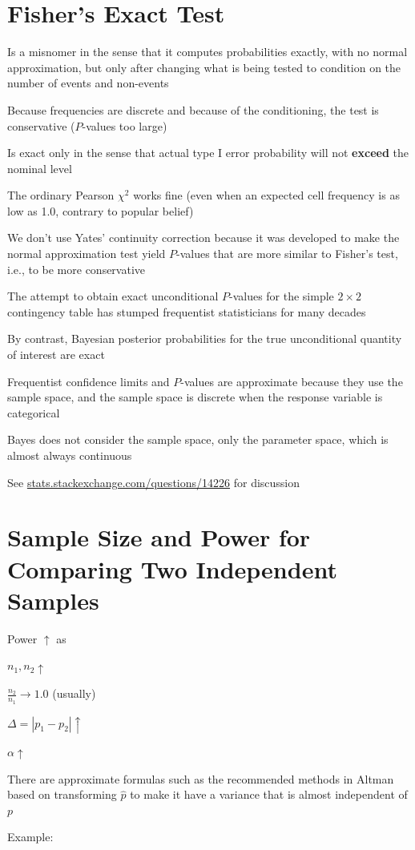 \section{Fisher's Exact Test}
\bi
\item Is a misnomer in the sense that it computes probabilities
  exactly, with no normal approximation, but only after changing what
  is being tested to condition on the number of events and non-events
\item Because frequencies are discrete and because of the
  conditioning, the test is conservative ($P$-values too large)
\item Is exact only in the sense that actual type I error probability will not \textbf{exceed} the nominal level
\item The ordinary Pearson $\chi^2$ works fine (even when
  an expected cell frequency is as low as 1.0, contrary to popular belief)
\item We don't use Yates' continuity correction because it was
  developed to make the normal approximation test yield $P$-values
  that are more similar to Fisher's test, i.e., to be more
  conservative
\item The attempt to obtain exact unconditional $P$-values for the simple $2\times 2$ contingency table has stumped frequentist statisticians for many decades~\cite{cho15elu}
\item By contrast, Bayesian posterior probabilities for the true unconditional quantity of interest are exact
 \bi
 \item Frequentist confidence limits and $P$-values are approximate because they use the sample space, and the sample space is discrete when the response variable is categorical
 \item Bayes does not consider the sample space, only the parameter space, which is almost always continuous
 \ei
\item See \href{https://stats.stackexchange.com/questions/14226}{stats.stackexchange.com/questions/14226} for discussion
\ei

\section{Sample Size and Power for Comparing Two Independent Samples}
\bi
\item Power $\uparrow$ as
 \bi
 \item $n_{1}, n_{2} \uparrow$
 \item $\frac{n_{2}}{n_{1}} \rightarrow 1.0$ (usually)
 \item $\Delta = |p_{1}-p_{2}| \uparrow$
 \item $\alpha \uparrow$
 \ei
\item There are approximate formulas such as the recommended methods in Altman based on transforming $\hat{p}$ to make it have a
  variance that is almost independent of $p$ 
\item Example:  \\

